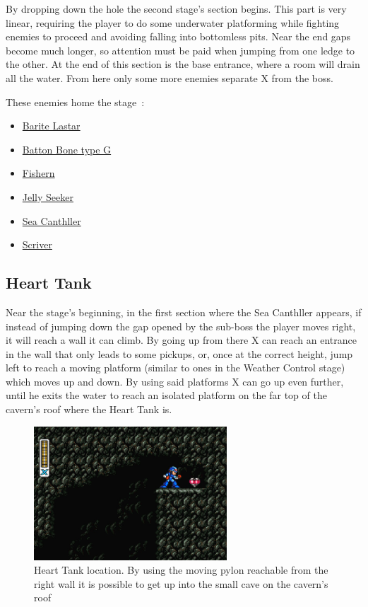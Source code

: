 By dropping down the hole the second stage's section begins. This part is very linear, requiring the player to do some underwater platforming while fighting enemies to proceed and avoiding falling into bottomless pits. Near the end gaps become much longer, so attention must be paid when jumping from one ledge to the other. At the end of this section is the base entrance, where a room will drain all the water. From here only some more enemies separate X from the boss.

These enemies home the stage~\cite{wiki:Deep_sea}:
\begin{itemize}
	\item \hyperlink {enem:Barite_Lastar}{Barite Lastar}
	\item \hyperlink {enem:Batton_Bone_type_G}{Batton Bone type G}
	\item \hyperlink {enem:Fishern}{Fishern}
	\item \hyperlink {enem:Jelly_Seeker}{Jelly Seeker}
	\item \hyperlink {miniboss:Sea_Canthller}{Sea Canthller}
	\item \hyperlink {enem:Scriver}{Scriver}
\end{itemize}

\subsection{Heart Tank}
Near the stage's beginning, in the first section where the Sea Canthller appears, if instead of jumping down the gap opened by the sub-boss the player moves right, it will reach a wall it can climb. By going up from there X can reach an entrance in the wall that only leads to some pickups, or, once at the correct height, jump left to reach a moving platform (similar to ones in the Weather Control stage) which moves up and down. By using said platforms X can go up even further, until he exits the water  to reach an isolated platform on the far top of the cavern's roof where the Heart Tank is.
\begin{figure}[htp]
	\centering
	\includegraphics[height=5cm]{figures/X2/Bubble_crab/Crab_heart.png}
	\caption{Heart Tank location. By using the moving pylon reachable from the right wall it is possible to get up into the small cave on the cavern's roof}
\end{figure}
